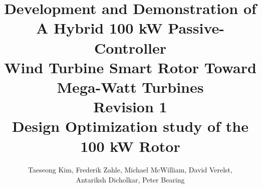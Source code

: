 \documentclass[
oneside,
paper=a4,
fontsize=9pt,
parskip=half,        %
DIV=12,              %
BCOR=10mm,           %
headings=normal,
appendixprefix=true, %
]{scrbook}			%
\begin{document}
\title{
Development and Demonstration of A Hybrid 100 kW Passive-Controller\\
Wind Turbine Smart Rotor Toward Mega-Watt Turbines\\
Revision 1\\
\vspace{0.5cm}
\large Design Optimization study of the 100 kW Rotor
}
\vspace{0.5cm}
\author{Taeseong Kim, Frederik Zahle, Michael McWilliam, David Verelst, \\ Antariksh Dicholkar, Peter Bearing}

\maketitle


\tableofcontents



\clearpage

\clearpage

%
\clearpage





\appendix



\end{document}
